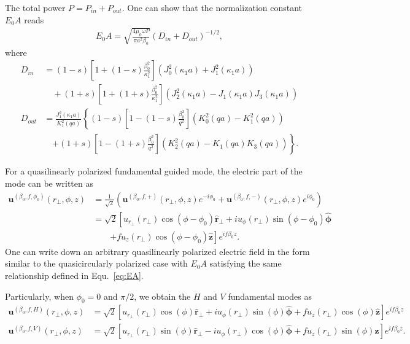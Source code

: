 \documentclass[preprint,aps,pra,onecolumn]{revtex4-1} %
\begin{document}
The total power $ P=P_{in}+P_{out} $. One can show that the normalization constant $ E_0 A $ reads
\begin{align}\label{eq:EA}
E_0 A=\sqrt{\frac{4\mu_0\omega P}{\pi a^2 \beta_0}}\left(D_{in} + D_{out} \right)^{-1/2},
\end{align}
where
\begin{align}
D_{in} &= (1-s)\left[ 1+(1-s)\frac{\beta_0^2}{\kappa_1^2}\right] \left(J_0^2(\kappa_1a) + J_1^2(\kappa_1a) \right) \nonumber\\
&\quad + (1+s)\left[ 1+(1+s)\frac{\beta_0^2}{\kappa_1^2}\right] \left(J_2^2(\kappa_1a)- J_1(\kappa_1a)J_3(\kappa_1a) \right)\\
D_{out} &= \frac{J_1^2(\kappa_1a)}{K_1^2(qa)}\left\{ (1-s)\left[ 1-(1-s)\frac{\beta_0^2}{q^2}\right] \left(K_0^2(qa) - K_1^2(qa) \right)\right. \nonumber\\
&\quad \left. + (1\!+\! s)\left[ 1\!-\! (1\!+\! s)\frac{\beta_0^2}{q^2}\right] \left(K_2^2(qa)\! -\! K_1(qa)K_3(qa) \right) \right\}.
\end{align}



For a quasilinearly polarized fundamental guided mode, the electric part of the mode can be written as 
\begin{align}
\mathbf{u}^{(\beta_0, f, \phi_0)}(r\!_\perp,\phi,z) &= \frac{1}{\sqrt{2}} \left(\mathbf{u}^{(\beta_0, f, +)}(r\!_\perp,\phi,z)e^{-i\phi_0} +\mathbf{u}^{(\beta_0, f, -)}(r\!_\perp,\phi,z)e^{i\phi_0} \right)\\
&= \sqrt{2}\left[u_{r\!_\perp}(r\!_\perp)\cos(\phi-\phi_0)\hat{\mathbf{r}}\!_\perp + iu_\phi(r\!_\perp)\sin(\phi-\phi_0)\hat{\boldsymbol{\phi}} \right. \nonumber \\
&\quad\quad \left. + fu_z(r\!_\perp)\cos(\phi-\phi_0)\hat{\mathbf{z}} \right]e^{if\beta_0 z}.
\end{align}
One can write down an arbitrary quasilinearly polarized electric field in the form similar to the quasicircularly polarized case with $E_0A$ satisfying the same relationship defined in Equ.~\eqref{eq:EA}. 

Particularly, when $\phi_0=0$ and $\pi/2$, we obtain the $H$ and $V$ fundamental modes as
\begin{align}
\mathbf{u}^{(\beta_0, f, H)}(r\!_\perp,\phi,z)
&= \sqrt{2}\left[u_{r\!_\perp}(r\!_\perp)\cos(\phi)\hat{\mathbf{r}}\!_\perp + iu_\phi(r\!_\perp)\sin(\phi)\hat{\boldsymbol{\phi}} + fu_z(r\!_\perp)\cos(\phi)\hat{\mathbf{z}} \right]e^{if\beta_0 z}\\
\mathbf{u}^{(\beta_0, f, V)}(r\!_\perp,\phi,z)
&= \sqrt{2}\left[u_{r\!_\perp}(r\!_\perp)\sin(\phi)\hat{\mathbf{r}}\!_\perp - iu_\phi(r\!_\perp)\cos(\phi)\hat{\boldsymbol{\phi}}  + fu_z(r\!_\perp)\sin(\phi)\hat{\mathbf{z}} \right]e^{if\beta_0 z}.
\end{align}
\end{document}
